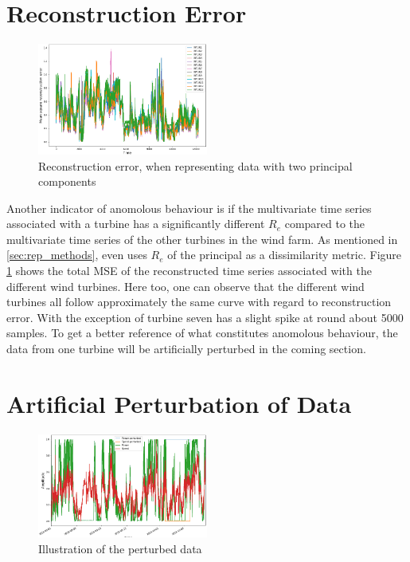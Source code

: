 \section{Reconstruction Error}

\begin{figure}[h]
    \begin{center}
    \includegraphics[width=0.5\textwidth]{data_exp/reconstruction_error}
    \end{center}
    \caption{Reconstruction error, when representing data with two principal components} 
    \label{fig:recon_error}
\end{figure}

Another indicator of anomolous behaviour is if the multivariate time series associated with a turbine has a significantly different $R_e$ compared to the multivariate time series of the other turbines in the wind farm. 
As mentioned in \ref{sec:rep_methods}, \textcite{multivariate_tsc_common_pca} even uses $R_e$ of the principal as a dissimilarity metric.
Figure \ref{fig:recon_error} shows the total MSE of the reconstructed time series associated with the different wind turbines. 
Here too, one can observe that the different wind turbines all follow approximately the same curve with regard to reconstruction error. 
With the exception of turbine seven has a slight spike at round about 5000 samples. 
To get a better reference of what constitutes anomolous behaviour, the data from one turbine will be artificially perturbed in the coming section. 

\section{Artificial Perturbation of Data}

\begin{figure}
    \begin{center}
    \includegraphics[width=0.5\textwidth]{data_exp/perturbed_vs_unperturbed}
    \end{center}
    \caption{Illustration of the perturbed data} 
    \label{fig:illu_perturbed_data}
\end{figure}

